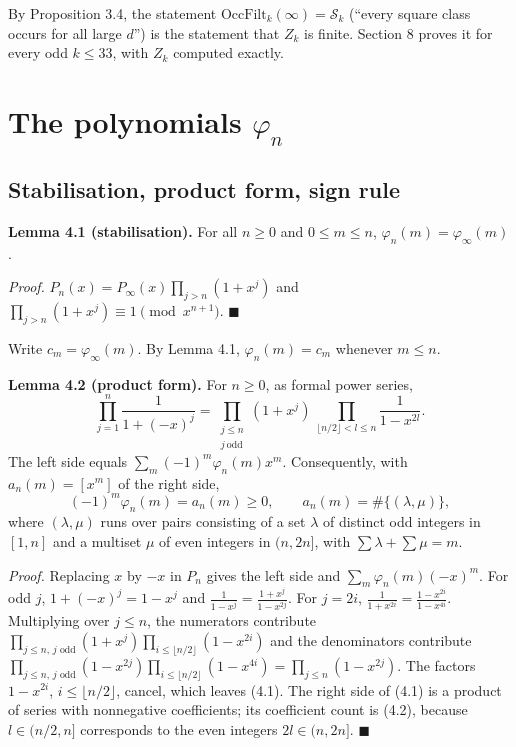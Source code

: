 By Proposition 3.4, the statement \(\mathrm{OccFilt}_k(\infty)=\mathcal S_k\) (``every square class occurs for all large \(d\)'') is the statement that \(Z_k\) is finite. Section 8 proves it for every odd \(k\le33\), with \(Z_k\) computed exactly.

\section{\texorpdfstring{The polynomials \(\varphi_n\)}{The polynomials \textbackslash varphi\_n}}\label{the-polynomials-varphi_n}

\subsection{Stabilisation, product form, sign rule}\label{stabilisation-product-form-sign-rule}

\textbf{Lemma 4.1 (stabilisation).} For all \(n\ge0\) and \(0\le m\le n\), \(\varphi_n(m)=\varphi_\infty(m)\).

\emph{Proof.} \(P_n(x)=P_\infty(x)\prod_{j>n}(1+x^j)\) and \(\prod_{j>n}(1+x^j)\equiv1 \pmod{x^{n+1}}\). \(\blacksquare\)

Write \(c_m=\varphi_\infty(m)\). By Lemma 4.1, \(\varphi_n(m)=c_m\) whenever \(m\le n\).

\textbf{Lemma 4.2 (product form).} For \(n\ge0\), as formal power series,
\[\prod_{j=1}^{n}\frac{1}{1+(-x)^{j}}=\prod_{\substack{j\le n\\ j\ \mathrm{odd}}}(1+x^{j})\ \prod_{\lfloor n/2\rfloor<l\le n}\frac{1}{1-x^{2l}} .\tag{4.1}\]
The left side equals \(\sum_m(-1)^m\varphi_n(m)x^m\). Consequently, with \(a_n(m)=[x^m]\) of the right side,
\[(-1)^m\varphi_n(m)=a_n(m)\ge0,\qquad a_n(m)=\#\{(\lambda,\mu)\},\tag{4.2}\]
where \((\lambda,\mu)\) runs over pairs consisting of a set \(\lambda\) of distinct odd integers in \([1,n]\) and a multiset \(\mu\) of even integers in \((n,2n]\), with \(\sum\lambda+\sum\mu=m\).

\emph{Proof.} Replacing \(x\) by \(-x\) in \(P_n\) gives the left side and \(\sum_m\varphi_n(m)(-x)^m\). For odd \(j\), \(1+(-x)^j=1-x^j\) and \(\frac1{1-x^j}=\frac{1+x^j}{1-x^{2j}}\). For \(j=2i\), \(\frac1{1+x^{2i}}=\frac{1-x^{2i}}{1-x^{4i}}\). Multiplying over \(j\le n\), the numerators contribute \(\prod_{j\le n,\,j\text{ odd}}(1+x^j)\prod_{i\le\lfloor n/2\rfloor}(1-x^{2i})\) and the denominators contribute \(\prod_{j\le n,\,j\text{ odd}}(1-x^{2j})\prod_{i\le\lfloor n/2\rfloor}(1-x^{4i})=\prod_{j\le n}(1-x^{2j})\). The factors \(1-x^{2i}\), \(i\le\lfloor n/2\rfloor\), cancel, which leaves (4.1). The right side of (4.1) is a product of series with nonnegative coefficients; its coefficient count is (4.2), because \(l\in(n/2,n]\) corresponds to the even integers \(2l\in(n,2n]\). \(\blacksquare\)

